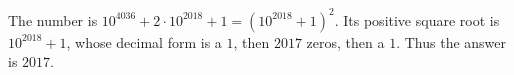 The number is $10^{4036}+2\cdot10^{2018}+1=(10^{2018}+1)^2$. Its positive square root is $10^{2018}+1$, whose decimal form is a $1$, then $2017$ zeros, then a $1$. Thus the answer is $\boxed{2017}$.
